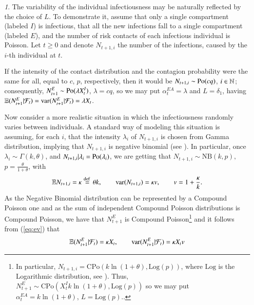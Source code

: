\documentclass[english]{elsarticle}
\theoremstyle{plain}
\theoremstyle{remark}
\newtheorem{rem}[thm]{\protect\remarkname}
\theoremstyle{plain}
\theoremstyle{definition}
\providecommand{\remarkname}{Remark}
\begin{document}
\begin{rem}
The variability of the individual infectiousness may be naturally
reflected by the choice of $L$. To demonstrate it, assume that only
a single compartment (labeled $I$) is infectious, that all the new
infections fall to a single compartment (labeled $E$), and the number
of risk contacts of each infectious individual is Poisson. Let $t\geq0$
and denote $N_{t+1,i}$ the number of the infections, caused by the
$i$-th individual at $t$. 

If the intensity of the contact distribution and the contagion probability
were the same for all, equal to $c$, $p$, respectively, then it
would be $N_{t+1,i}\sim\mathrm{Po}(cq)$, $i\in\mathbb{N}$; consequently, $N_{t+1}^{E}\sim\mathrm{Po}(\lambda X_{t}^{I})$,
$\lambda=cq$, so we may put $\alpha_{t}^{EA}=\lambda$ and $L=\delta_{1}$,
having $\mathbb{E}(N_{t+1}^{E}|\mathcal{F}_{t})=\mathrm{\mathrm{var}}(N_{t+1}^{E}|\mathcal{F}_{t})=\lambda X_{t}$.

Now consider a more realistic situation in which the infectiousness
randomly varies between individuals. A standard way of modeling this
situation is assuming, for each $i$, that the intensity $\lambda_{i}$
of $N_{t+1,i}$ is chosen from Gamma distribution, implying that $N_{t+1,i}$
is negative binomial (see \cite{zhou2013negative}). In particular,
once $\lambda_{i}\sim\Gamma(k,\theta)$, and $N_{t+1,i}|\lambda_{i}=\mathrm{Po}(\lambda_{i})$,
we are getting that $N_{t+1,i}\sim\mathrm{NB}(k,p),$ $p=\frac{\theta}{1+\theta}$,
with
\begin{equation}
\mathbb{E} N_{t+1,i}=\kappa\stackrel{\text{def }}{=}\theta k,\qquad\mathrm{var}(N_{t+1,i})=\kappa v,\qquad v=1+\frac{\kappa}{k}.\label{eq:ev}
\end{equation}
As the Negative Binomial distribution can be represented by a Compound
Poisson one and as the sum of independent Compound Poisson distributions
is Compound Poisson, we have that $N_{t+1}^{E}$ is Compound Poisson\footnote{In particular, $N_{t+1,i}=\mathrm{CPo}(k\ln(1+\theta),\mathrm{Log}(p))$,
where $\mathrm{Log}$ is the Logarithmic distribution, see \cite{zhou2013negative}).
Thus, $N_{t+1}^{E}\sim\mathrm{CPo}(X_{t}^{I}k\ln(1+\theta),\mathrm{Log}(p))$
so we may put $\alpha_{t}^{EA}=k\ln(1+\theta)$, $L=\mathrm{Log}(p)$..} and it follows from (\ref{eq:ev}) that 
\[
\mathbb{E}(N_{t+1}^{E}|\mathcal{F}_{t})=\kappa X_{t},\qquad\mathrm{\mathrm{var}}(N_{t+1}^{E}|\mathcal{F}_{t})=\kappa X_{t}v
\]
\end{rem}
\end{document}
